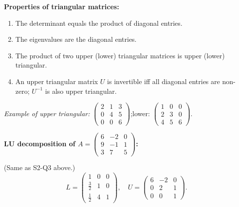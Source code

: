 \documentclass[12pt,a3paper]{article}
\begin{document}
\begin{tcolorbox}[enhanced,breakable,
  colback=cB!4,colframe=cB,boxrule=0.8pt,arc=5pt,
  title={\textbf{Answer --- Triangular Matrix Properties; LU Decomposition}},
  fonttitle=\bfseries\color{white},colbacktitle=cB]

\textbf{Properties of triangular matrices:}
\begin{enumerate}[label=\textbf{\arabic*.},itemsep=2pt]
  \item The determinant equals the product of diagonal entries.
  \item The eigenvalues are the diagonal entries.
  \item The product of two upper (lower) triangular matrices is upper (lower) triangular.
  \item An upper triangular matrix $U$ is invertible iff all diagonal entries are non-zero; $U^{-1}$ is also upper triangular.
\end{enumerate}
\textit{Example of upper triangular:} $\begin{pmatrix}2&1&3\\0&4&5\\0&0&6\end{pmatrix}$;\quad lower: $\begin{pmatrix}1&0&0\\2&3&0\\4&5&6\end{pmatrix}$.

\medskip
\textbf{LU decomposition of $A=\begin{pmatrix}6&-2&0\\9&-1&1\\3&7&5\end{pmatrix}$:}

(Same as S2-Q3 above.)
\[
L=\begin{pmatrix}1&0&0\\\frac{3}{2}&1&0\\\frac{1}{2}&4&1\end{pmatrix},\quad
U=\begin{pmatrix}6&-2&0\\0&2&1\\0&0&1\end{pmatrix}.
\]

\end{tcolorbox}
\end{document}
